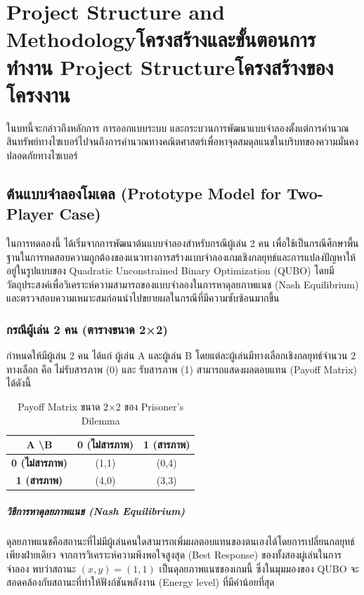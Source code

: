\chapter{\ifproject%
\ifenglish Project Structure and Methodology\else โครงสร้างและขั้นตอนการทำงาน\fi
\else%
\ifenglish Project Structure\else โครงสร้างของโครงงาน\fi
\fi
}

\hspace{1.5em}ในบทนี้จะกล่าวถึงหลักการ การออกแบบระบบ และกระบวนการพัฒนาแบบจำลองตั้งแต่การคำนวณสินทรัพย์ทางไซเบอร์ไปจนถึงการคำนวณทางคณิตศาสตร์เพื่อหาจุดสมดุลแนชในบริบทของความมั่นคงปลอดภัยทางไซเบอร์


\section{ต้นแบบจำลองโมเดล (Prototype Model for Two-Player Case)}
ในการทดลองนี้ ได้เริ่มจากการพัฒนาต้นแบบจำลองสำหรับกรณีผู้เล่น 2 คน เพื่อใช้เป็นกรณีศึกษาพื้นฐานในการทดสอบความถูกต้องของแนวทางการสร้างแบบจำลองเกมเชิงกลยุทธ์และการแปลงปัญหาให้อยู่ในรูปแบบของ Quadratic Unconstrained Binary Optimization (QUBO) โดยมีวัตถุประสงค์เพื่อวิเคราะห์ความสามารถของแบบจำลองในการหาดุลยภาพแนช (Nash Equilibrium) และตรวจสอบความเหมาะสมก่อนนำไปขยายผลในกรณีที่มีความซับซ้อนมากขึ้น


\subsection{กรณีผู้เล่น 2 คน (ตารางขนาด 2×2)}
กำหนดให้มีผู้เล่น 2 คน ได้แก่ ผู้เล่น A และผู้เล่น B โดยแต่ละผู้เล่นมีทางเลือกเชิงกลยุทธ์จำนวน 2 ทางเลือก คือ ไม่รับสารภาพ (0) และ รับสารภาพ (1) สามารถแสดงผลตอบแทน (Payoff Matrix) ได้ดังนี้

\begin{table}[h]
\centering
\begin{tabular}{|c|c|c|}
\hline
\textbf{A \textbackslash B} & \textbf{0 (ไม่สารภาพ)} & \textbf{1 (สารภาพ)} \\ \hline
\textbf{0 (ไม่สารภาพ)} & (1,1) & (0,4) \\ \hline
\textbf{1 (สารภาพ)} & (4,0) & (3,3) \\ \hline
\end{tabular}
\caption{Payoff Matrix ขนาด 2×2 ของ Prisoner's Dilemma}
\end{table}

\paragraph{วิธีการหาดุลยภาพแนช (Nash Equilibrium)}
ดุลยภาพแนชคือสถานะที่ไม่มีผู้เล่นคนใดสามารถเพิ่มผลตอบแทนของตนเองได้โดยการเปลี่ยนกลยุทธ์เพียงฝ่ายเดียว จากการวิเคราะห์ความพึงพอใจสูงสุด (Best Response) ของทั้งสองผู่เล่นในการจำลอง พบว่าสถานะ $(x,y) = (1,1)$ เป็นดุลยภาพแนชของเกมนี้ ซึ่งในมุมมองของ QUBO จะสอดคล้องกับสถานะที่ทำให้ฟังก์ชันพลังงาน (Energy level) ที่มีค่าน้อยที่สุด

